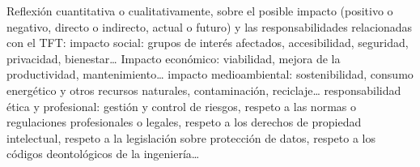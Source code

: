 Reflexión cuantitativa o cualitativamente, sobre el posible impacto (positivo o negativo, directo o indirecto, actual o futuro) y las responsabilidades relacionadas con el TFT:  impacto social: grupos de interés afectados, accesibilidad, seguridad, privacidad, bienestar…  Impacto económico: viabilidad, mejora de la productividad, mantenimiento…  impacto medioambiental: sostenibilidad, consumo energético y otros recursos naturales, contaminación, reciclaje…  responsabilidad ética y profesional: gestión y control de riesgos, respeto a las normas o regulaciones profesionales o legales, respeto a los derechos de propiedad intelectual, respeto a la legislación sobre protección de datos, respeto a los códigos deontológicos de la ingeniería…  